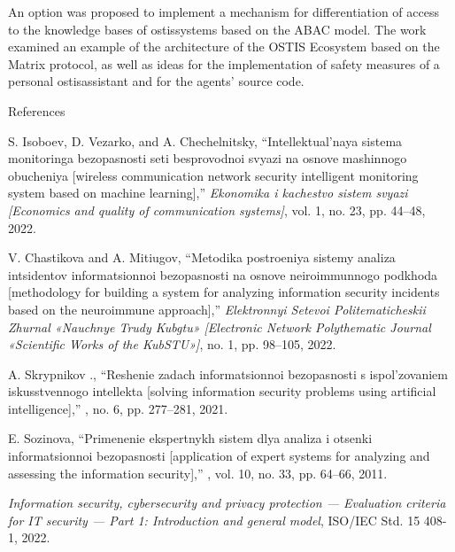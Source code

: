 \documentclass{article}
\begin{document}
\begin{multicols}{2}
\renewcommand{\baselinestretch}{0.5}
An option was proposed to implement a mechanism for
differentiation of access to the knowledge bases of ostissystems based on the ABAC model. The work examined
an example of the architecture of the OSTIS Ecosystem
based on the Matrix protocol, as well as ideas for the
implementation of safety measures of a personal ostisassistant and for the agents’ source code.

\begin{center}
    References
\end{center}

\footnotesize
\begin{enumerate}[label=\text{[\arabic*]}, noitemsep,topsep=1.5pt,parsep=1.5pt,partopsep=1.5pt]
\item S. Isoboev, D. Vezarko, and A. Chechelnitsky, “Intellektual’naya
sistema monitoringa bezopasnosti seti besprovodnoi svyazi
na osnove mashinnogo obucheniya [wireless communication
network security intelligent monitoring system based on machine
learning],” \textit{Ekonomika i kachestvo sistem svyazi [Economics and
quality of communication systems]}, vol. 1, no. 23, pp. 44–48,
2022.
\item V. Chastikova and A. Mitiugov, “Metodika postroeniya sistemy
analiza intsidentov informatsionnoi bezopasnosti na osnove
neiroimmunnogo podkhoda [methodology for building a system
for analyzing information security incidents based on the
neuroimmune approach],” \textit{Elektronnyi Setevoi Politematicheskii
Zhurnal «Nauchnye Trudy Kubgtu» [Electronic Network
Polythematic Journal «Scientific Works of the KubSTU»]}, no. 1,
pp. 98–105, 2022.
\item A. Skrypnikov ., “Reshenie zadach informatsionnoi
bezopasnosti s ispol’zovaniem iskusstvennogo intellekta
[solving information security problems using artificial
intelligence],” , no. 6, pp. 277–281, 2021.
\item E. Sozinova, “Primenenie ekspertnykh sistem dlya analiza
i otsenki informatsionnoi bezopasnosti [application of expert
systems for analyzing and assessing the information security],”
, vol. 10, no. 33, pp. 64–66,
2011.
\item \textit{Information security, cybersecurity and privacy protection —
Evaluation criteria for IT security — Part 1: Introduction and
general model}, ISO/IEC Std. 15 408-1, 2022.

\end{enumerate}
\end{multicols}
\end{document}

